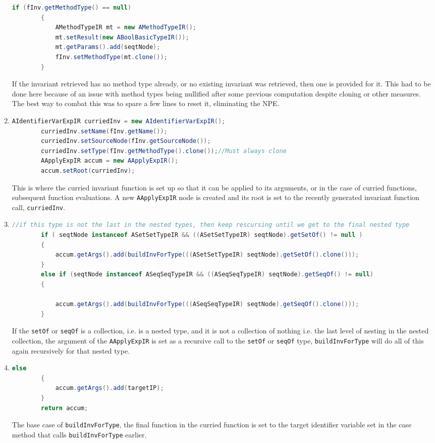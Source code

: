 \begin{enumerate}
\begin{lstlisting}[language=Java]
		if (fInv.getMethodType() == null)
    	{
    		AMethodTypeIR mt = new AMethodTypeIR();
    		mt.setResult(new ABoolBasicTypeIR());
    		mt.getParams().add(seqtNode);
    		fInv.setMethodType(mt.clone());
    	}
		\end{lstlisting}
		If the invariant retrieved has no method type already, or no existing invariant was retrieved, then one is provided for it. This had to be done here because of an issue with method types being nullified after some previous computation despite cloning or other measures. The best way to combat this was to spare a few lines to reset it, eliminating the NPE.
		\item \begin{lstlisting}[language=Java]
		AIdentifierVarExpIR curriedInv = new AIdentifierVarExpIR();
        curriedInv.setName(fInv.getName());
        curriedInv.setSourceNode(fInv.getSourceNode());
        curriedInv.setType(fInv.getMethodType().clone());//Must always clone
    	AApplyExpIR accum = new AApplyExpIR();
    	accum.setRoot(curriedInv);
		\end{lstlisting}
		This is where the curried invariant function is set up so that it can be applied to its arguments, or in the case of curried functions, subsequent function evaluations. A new  \lstinline[language=Java]{AApplyExpIR} node is created and its root is set to the recently generated invariant function call,  \lstinline[language=Java]{curriedInv}.
		\item \begin{lstlisting}[language=Java]
		//if this type is not the last in the nested types, then keep rescursing until we get to the final nested type
    	if ( seqtNode instanceof ASetSetTypeIR && ((ASetSetTypeIR) seqtNode).getSetOf() != null )
    	{
    		accum.getArgs().add(buildInvForType(((ASetSetTypeIR) seqtNode).getSetOf().clone()));
    	}
    	else if (seqtNode instanceof ASeqSeqTypeIR && ((ASeqSeqTypeIR) seqtNode).getSeqOf() != null)
    	{
    		
    		accum.getArgs().add(buildInvForType(((ASeqSeqTypeIR) seqtNode).getSeqOf().clone()));
    	}
		\end{lstlisting}
		If the  \lstinline[language=Java]{setOf} or  \lstinline[language=Java]{seqOf} is a collection, i.e. is a nested type, and it is not a collection of nothing i.e. the last level of nesting in the nested collection, the argument of the  \lstinline[language=Java]{AApplyExpIR} is set as a recursive call to the  \lstinline[language=Java]{setOf} or \lstinline[language=Java]{seqOf} type,  \lstinline[language=Java]{buildInvForType} will do all of this again recursively for that nested type.
		\item \begin{lstlisting}[language=Java]
		else
    	{
    		accum.getArgs().add(targetIP);
    	}
    	return accum;
		\end{lstlisting}
		The base case of \lstinline[language=Java]{buildInvForType}, the final function in the curried function is set to the target identifier variable set in the case method that calls \lstinline[language=Java]{buildInvForType} earlier.
	\end{enumerate}
